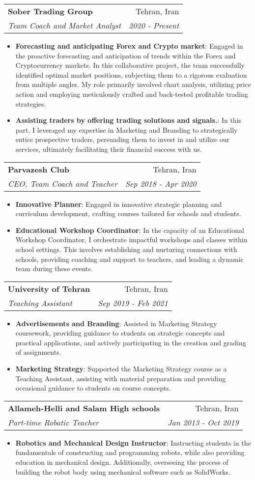 \documentclass[letterpaper,11pt]{article}
\makeatletter
\newcommand{\resumeItem}[2]{
  \item\small{
    \textbf{#1}{: #2 \vspace{-2pt}}
  }
}
\newcommand{\resumeSubheading}[4]{
  \vspace{5pt}\item
    \begin{tabular*}{0.97\textwidth}{l@{\extracolsep{\fill}}r}
      \textbf{#1} & #2 \\
      \textit{\small#3} & \textit{\small #4} \\
    \end{tabular*}\vspace{-5pt}
}
\newcommand{\resumeItemListStart}{\begin{itemize}}
\newcommand{\resumeItemListEnd}{\end{itemize}\vspace{-5pt}}
\makeatother
\begin{document}
    \resumeSubheading
      {Sober Trading Group}{Tehran, Iran}
      {Team Coach and Market Analyst}{2020 - Present}
      \resumeItemListStart
        \resumeItem{Forecasting and anticipating Forex and Crypto market}
          {Engaged in the proactive forecasting and anticipation of trends within the Forex and Cryptocurrency markets. In this collaborative project, the team successfully identified optimal market positions, subjecting them to a rigorous evaluation from multiple angles. My role primarily involved chart analysis, utilizing price action and employing meticulously crafted and back-tested profitable trading strategies.}
        \resumeItem{Assisting traders by offering trading solutions and signals.}
          {In this part, I leveraged my expertise in Marketing and Branding to strategically entice prospective traders, persuading them to invest in and utilize our services, ultimately facilitating their financial success with us.}
      \resumeItemListEnd
    
    \resumeSubheading
      {Parvazesh Club}{Tehran, Iran}{CEO, Team Coach and Teacher}
      {Sep 2018 - Apr 2020}
      \resumeItemListStart
        \resumeItem{Innovative Planner}
          {Engaged in innovative strategic planning and curriculum development, crafting courses tailored for schools and students.}
        \resumeItem{Educational Workshop Coordinator}
          {In the capacity of an Educational Workshop Coordinator, I orchestrate impactful workshops and classes within school settings. This involves establishing and nurturing connections with schools, providing coaching and support to teachers, and leading a dynamic team during these events. }
      \resumeItemListEnd

    \resumeSubheading
      {University of Tehran}{Tehran, Iran}
      {Teaching Assistant}{Sep 2019 - Feb 2021}
      \resumeItemListStart
        \resumeItem{Advertisements and Branding}
          {Assisted in Marketing Strategy coursework, providing guidance to students on strategic concepts and practical applications, and actively participating in the creation and grading of assignments.}
        \resumeItem{Marketing Strategy}
          {Supported the Marketing Strategy course as a Teaching Assistant, assisting with material preparation and providing occasional guidance to students on course concepts.}
      \resumeItemListEnd

    \resumeSubheading
      {Allameh-Helli and Salam High schools}{Tehran, Iran}
      {Part-time Robatic Teacher}{Jan 2013 - Oct 2019}
      \resumeItemListStart
        \resumeItem{Robotics and Mechanical Design Instructor}
          {Instructing students in the fundamentals of constructing and programming robots, while also providing education in mechanical design. Additionally, overseeing the process of building the robot body using mechanical software such as SolidWorks.}
      \resumeItemListEnd
    
\end{document}
